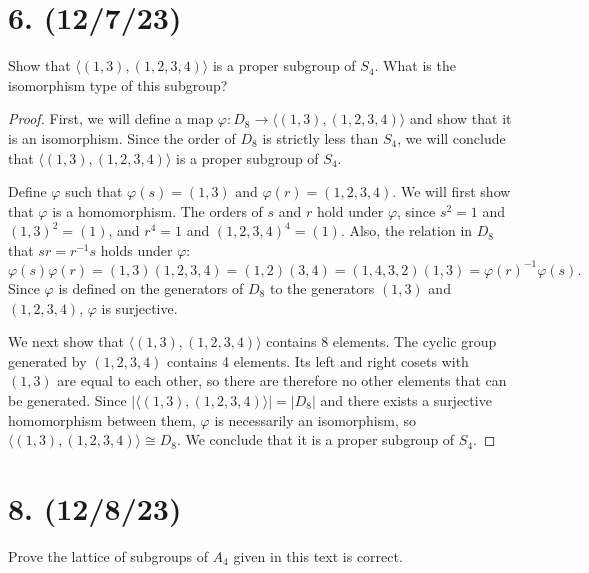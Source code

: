 \documentclass{article}
\begin{document}
\section*{6. (12/7/23)}

Show that $\langle (1, 3), (1, 2, 3, 4) \rangle$ is a proper subgroup of $S_4$. What is the isomorphism type of this subgroup?

\begin{proof}
    First, we will define a map $\varphi: D_8 \rightarrow \langle (1, 3), (1, 2, 3, 4) \rangle$ and show that it is an isomorphism. Since the order of $D_8$ is strictly less than $S_4$, we will conclude that $\langle (1, 3), (1, 2, 3, 4) \rangle$ is a proper subgroup of $S_4$.

    Define $\varphi$ such that $\varphi(s) = (1, 3)$ and $\varphi(r) = (1, 2, 3, 4)$. We will first show that $\varphi$ is a homomorphism. The orders of $s$ and $r$ hold under $\varphi$, since $s^2 = 1$ and $(1, 3)^2 = (1)$, and $r^4 = 1$ and $(1, 2, 3, 4)^4 = (1)$. Also, the relation in $D_8$ that $sr = r^{-1}s$ holds under $\varphi$:
    \begin{equation*}
        \varphi(s)\varphi(r) = (1, 3)(1, 2, 3, 4) = (1, 2)(3, 4) = (1, 4, 3, 2)(1, 3) = \varphi(r)^{-1} \varphi(s).
    \end{equation*}
    Since $\varphi$ is defined on the generators of $D_8$ to the generators $(1, 3)$ and $(1, 2, 3, 4)$, $\varphi$ is surjective.

    We next show that $\langle (1, 3), (1, 2, 3, 4) \rangle$ contains 8 elements. The cyclic group generated by $(1, 2, 3, 4)$ contains 4 elements. Its left and right cosets with $(1, 3)$ are equal to each other, so there are therefore no other elements that can be generated. Since $|\langle (1, 3), (1, 2, 3, 4) \rangle| = |D_8|$ and there exists a surjective homomorphism between them, $\varphi$ is necessarily an isomorphism, so $\langle (1, 3), (1, 2, 3, 4) \rangle \cong D_8$. We conclude that it is a proper subgroup of $S_4$.
\end{proof}

\section*{8. (12/8/23)}

Prove the lattice of subgroups of $A_4$ given in this text is correct.
\end{document}

